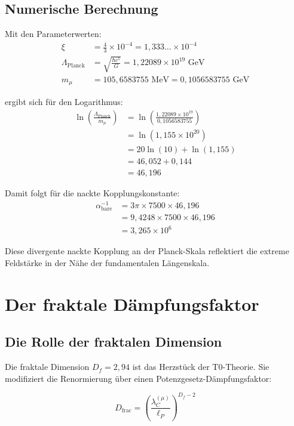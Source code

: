 \documentclass[12pt,a4paper]{article}
\theoremstyle{definition}
\begin{document}
	\subsection{Numerische Berechnung}
	
	Mit den Parameterwerten:
	\begin{align}
		\xi &= \frac{4}{3} \times 10^{-4} = 1{,}333\ldots \times 10^{-4}\\
		\Lambda_{\text{Planck}} &= \sqrt{\frac{\hbar c^5}{G}} = 1{,}22089 \times 10^{19} \text{ GeV}\\
		m_{\mu} &= 105{,}6583755 \text{ MeV} = 0{,}1056583755 \text{ GeV}
	\end{align}
	
	ergibt sich für den Logarithmus:
	\begin{align}
		\ln\left(\frac{\Lambda_{\text{Planck}}}{m_{\mu}}\right) &= \ln\left(\frac{1{,}22089 \times 10^{19}}{0{,}1056583755}\right)\\
		&= \ln(1{,}155 \times 10^{20})\\
		&= 20 \ln(10) + \ln(1{,}155)\\
		&= 46{,}052 + 0{,}144\\
		&= 46{,}196
	\end{align}
	
	Damit folgt für die nackte Kopplungskonstante:
	\begin{align}
		\alpha_{\text{bare}}^{-1} &= 3\pi \times 7500 \times 46{,}196\\
		&= 9{,}4248 \times 7500 \times 46{,}196\\
		&= 3{,}265 \times 10^6
	\end{align}
	
	Diese divergente nackte Kopplung an der Planck-Skala reflektiert die extreme Feldstärke in der Nähe der fundamentalen Längenskala.
	
	\section{Der fraktale Dämpfungsfaktor}
	
	\subsection{Die Rolle der fraktalen Dimension}
	
	Die fraktale Dimension $D_f = 2{,}94$ ist das Herzstück der T0-Theorie. Sie modifiziert die Renormierung über einen Potenzgesetz-Dämpfungsfaktor:
	
	\begin{equation}
		D_{\text{frac}} = \left(\frac{\lambda_C^{(\mu)}}{\ell_P}\right)^{D_f - 2}
	\end{equation}
	
\end{document}
